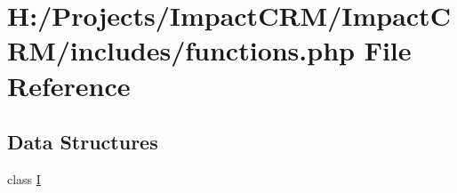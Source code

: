 \hypertarget{functions_8php}{
\section{H:/Projects/ImpactCRM/ImpactCRM/includes/functions.php File Reference}
\label{functions_8php}
}
\subsection*{Data Structures}
\begin{DoxyCompactItemize}
\item 
class \hyperlink{classI}{I}
\end{DoxyCompactItemize}
